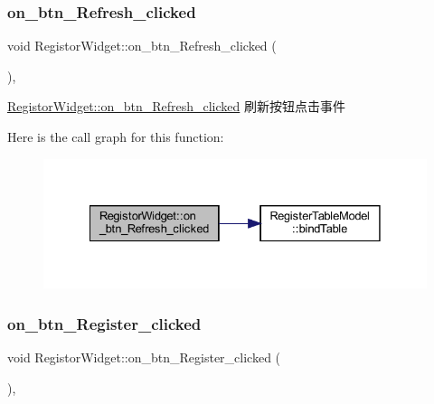 \subsubsection{\texorpdfstring{on\_btn\_Refresh\_clicked}{on\_btn\_Refresh\_clicked}}
{\footnotesize\ttfamily void Registor\+Widget\+::on\+\_\+btn\+\_\+\+Refresh\+\_\+clicked (\begin{DoxyParamCaption}{ }\end{DoxyParamCaption})\hspace{0.3cm}{\ttfamily [private]}, {\ttfamily [slot]}}



\mbox{\hyperlink{class_registor_widget_adb55365b88e07391d6e8e7c639c68219}{Registor\+Widget\+::on\+\_\+btn\+\_\+\+Refresh\+\_\+clicked}} 刷新按钮点击事件 

Here is the call graph for this function\+:
\nopagebreak
\begin{figure}[H]
\begin{center}
\leavevmode
\includegraphics[width=328pt]{class_registor_widget_adb55365b88e07391d6e8e7c639c68219_cgraph}
\end{center}
\end{figure}
\mbox{\label{class_registor_widget_ae280a0ef976dd2835f4a33c60b67e8a9}} 
\subsubsection{\texorpdfstring{on\_btn\_Register\_clicked}{on\_btn\_Register\_clicked}}
{\footnotesize\ttfamily void Registor\+Widget\+::on\+\_\+btn\+\_\+\+Register\+\_\+clicked (\begin{DoxyParamCaption}{ }\end{DoxyParamCaption})\hspace{0.3cm}{\ttfamily [private]}, {\ttfamily [slot]}}



